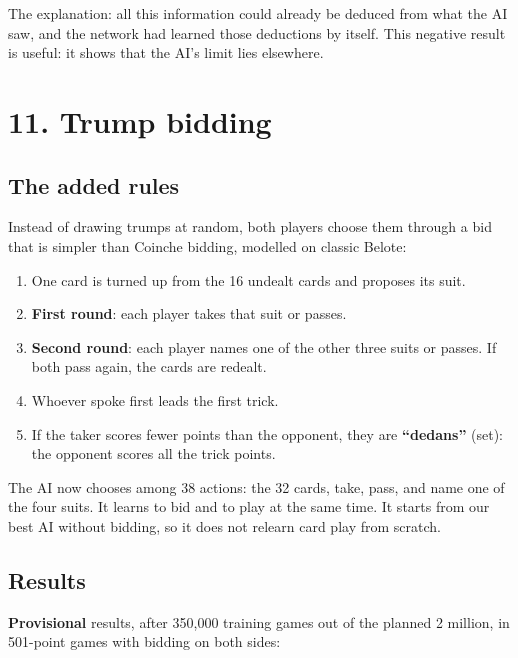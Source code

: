 The explanation: all this information could already be deduced from what the AI saw, and the network had learned those deductions by itself. This negative result is useful: it shows that the AI's limit lies elsewhere.

\section*{11. Trump bidding}

\subsection*{The added rules}

Instead of drawing trumps at random, both players choose them through a bid that is simpler than Coinche bidding, modelled on classic Belote:

\begin{enumerate}

  \item One card is turned up from the 16 undealt cards and proposes its suit.

  \item \textbf{First round}: each player takes that suit or passes.

  \item \textbf{Second round}: each player names one of the other three suits or passes. If both pass again, the cards are redealt.

  \item Whoever spoke first leads the first trick.

  \item If the taker scores fewer points than the opponent, they are \textbf{``dedans''} (set): the opponent scores all the trick points.

\end{enumerate}

The AI now chooses among 38 actions: the 32 cards, take, pass, and name one of the four suits. It learns to bid and to play at the same time. It starts from our best AI without bidding, so it does not relearn card play from scratch.

\subsection*{Results}

\textbf{Provisional} results, after 350,000 training games out of the planned 2 million, in 501-point games with bidding on both sides:

